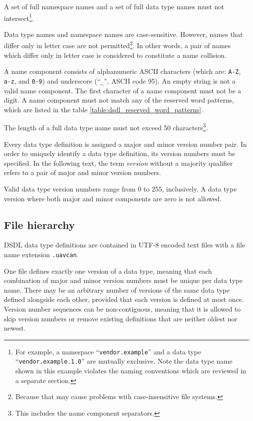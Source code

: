 A set of full namespace names and a set of full data type names must not intersect\footnote{%
    For example, a namespace ``\texttt{vendor.example}'' and a data type ``\texttt{vendor.example.1.0}''
    are mutually exclusive.
    Note the data type name shown in this example violates the naming conventions
    which are reviewed in a separate section.
}.

Data type names and namespace names are case-sensitive.
However, names that differ only in letter case are not permitted\footnote{%
Because that may cause problems with case-insensitive file systems.}.
In other words, a pair of names which differ only in letter case is considered to constitute a name collision.

A name component consists of alphanumeric ASCII characters (which are: \verb|A-Z|, \verb|a-z|, and \verb|0-9|)
and underscore (``\verb|_|'', ASCII code 95).
An empty string is not a valid name component.
The first character of a name component must not be a digit.
A name component must not match any of the reserved word patterns,
which are listed in the table \ref{table:dsdl_reserved_word_patterns}.

The length of a full data type name must not exceed 50
characters\footnote{This includes the name component separators.}.

Every data type definition is assigned a major and minor version number pair.
In order to uniquely identify a data type definition, its version numbers must be specified.
In the following text, the term \emph{version} without a majority qualifier refers to
a pair of major and minor version numbers.

Valid data type version numbers range from 0 to 255, inclusively.
A data type version where both major and minor components are zero is not allowed.

\subsection{File hierarchy}

DSDL data type definitions are contained in UTF-8 encoded text files with a file name extension \verb|.uavcan|.

One file defines exactly one version of a data type,
meaning that each combination of major and minor version numbers must be unique per data type name.
There may be an arbitrary number of versions of the same data type defined alongside each other,
provided that each version is defined at most once.
Version number sequences can be non-contiguous,
meaning that it is allowed to skip version numbers or remove existing definitions that are neither oldest nor newest.

